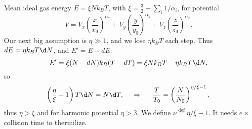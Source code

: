



% 



Mean ideal gas energy $E = \xi N k_B T$, with $\xi = \frac{3}{2} + \sum_i 1/\alpha_i$, for potential
\begin{equation*}
	V = V_x \left(\frac{x}{x_0}\right)^{\alpha_x} + V_y \left(\frac{y}{y_0}\right)^{\alpha_y} + V_z \left(\frac{z}{z_0}\right)^{\alpha_z}.
\end{equation*}
Our next big assumption is $\eta \gg 1$, and we lose $\eta k_B T$ each step. Thus $dE = \eta k_B T \d N$, and $E' = E - dE$:
\begin{equation*}
	E' = \xi (N-  dN) k_B (T-dT) = \xi N k_B T - \eta k_B T \d N, 
\end{equation*}
so 
\begin{equation*}
	\left(\frac{\eta}{\xi} - 1\right) T \d N = N \d T,
	\hspace{0.5cm} \Rightarrow \hspace{0.5cm}	
	\frac{T}{T_0} = \left(\frac{N}{N_0}\right)^{\eta/\xi - 1},
\end{equation*}
thus $\eta > \xi$ and for harmonic potential $\eta > 3$. We define $\nu \overset{\mathrm{def}}{=} \eta/\xi - 1$. It needs $e \times$ collision time to thermilize. 










% 



% 



